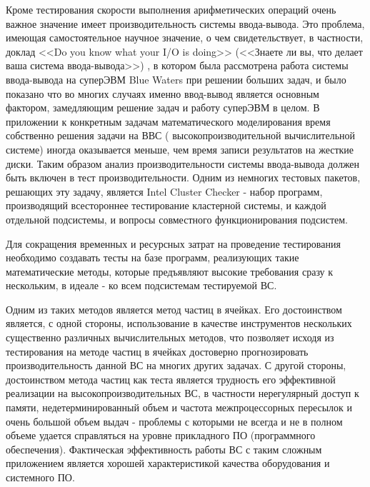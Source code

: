 Кроме тестирования скорости выполнения арифметических операций очень важное значение имеет производительность системы ввода-вывода. Это проблема, имеющая самостоятельное научное значение, о чем свидетельствует, в частности, доклад  <<Do you know what your I/O is doing>> (<<Знаете ли вы, что делает ваша система ввода-вывода>>) \cite{IOdoing}, в котором была рассмотрена работа системы ввода-вывода на суперЭВМ Blue Waters при решении больших задач, и было показано что во многих случаях именно ввод-вывод является основным фактором, замедляющим решение задач и работу суперЭВМ в целом. В приложении к конкретным задачам математического моделирования время собственно решения задачи на ВВС ( высокопроизводительной вычислительной системе) иногда оказывается меньше, чем время записи результатов на жесткие диски.
Таким образом анализ производительности системы ввода-вывода должен быть включен в тест производительности.
Одним из немногих тестовых пакетов, решающих эту задачу, является Intel Cluster Checker - набор программ, производящий всестороннее тестирование кластерной системы, и каждой отдельной подсистемы, и вопросы совместного функционирования подсистем. 

Для сокращения временных и ресурсных затрат на проведение тестирования необходимо создавать тесты на базе программ, реализующих такие математические методы, которые предъявляют высокие требования сразу к нескольким, в идеале - ко всем подсистемам тестируемой ВС. 

Одним из таких методов является метод частиц в ячейках. Его достоинством является, с одной стороны, использование в качестве инструментов нескольких существенно различных вычислительных методов, что позволяет исходя из тестирования на методе частиц в ячейках достоверно прогнозировать производительность данной ВС на многих других задачах. С другой стороны, достоинством метода частиц как теста является трудность его эффективной реализации на высокопроизводительных ВС, в частности нерегулярный доступ к памяти, недетерминированный объем и частота межпроцессорных пересылок и очень большой объем выдач - проблемы с которыми не всегда и не в полном объеме удается справляться на уровне прикладного ПО (программного обеспечения). Фактическая эффективность работы ВС с таким сложным приложением является хорошей характеристикой качества оборудования и системного ПО.

